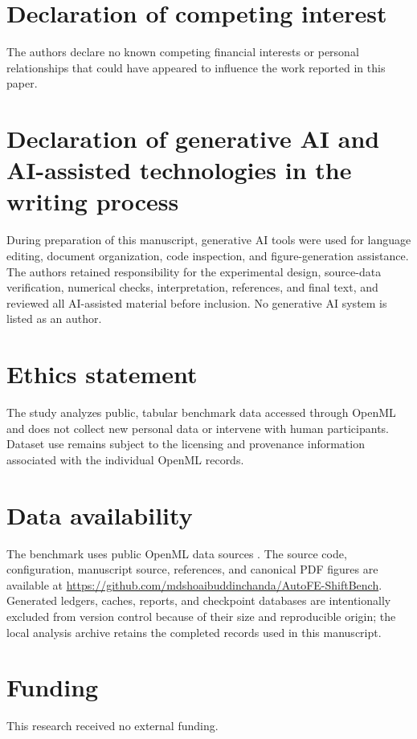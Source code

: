 \documentclass[preprint,12pt]{elsarticle}
\begin{document}
\section*{Declaration of competing interest}
The authors declare no known competing financial interests or personal relationships that could have appeared to influence the work reported in this paper.

\section*{Declaration of generative AI and AI-assisted technologies in the writing process}
During preparation of this manuscript, generative AI tools were used for language editing, document organization, code inspection, and figure-generation assistance.  The authors retained responsibility for the experimental design, source-data verification, numerical checks, interpretation, references, and final text, and reviewed all AI-assisted material before inclusion.  No generative AI system is listed as an author.

\section*{Ethics statement}
The study analyzes public, tabular benchmark data accessed through OpenML and does not collect new personal data or intervene with human participants.  Dataset use remains subject to the licensing and provenance information associated with the individual OpenML records.

\section*{Data availability}
The benchmark uses public OpenML data sources \citep{vanschoren2013}.  The source code, configuration, manuscript source, references, and canonical PDF figures are available at \url{https://github.com/mdshoaibuddinchanda/AutoFE-ShiftBench}.  Generated ledgers, caches, reports, and checkpoint databases are intentionally excluded from version control because of their size and reproducible origin; the local analysis archive retains the completed records used in this manuscript.

\section*{Funding}
This research received no external funding.



\end{document}
